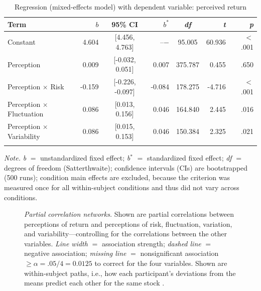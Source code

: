 \documentclass[a4paper,man, natbib,floatsintext]{apa6} %
\begin{document}
\begin{table}[H]
\begin{center}
\begin{threeparttable}
\caption{Regression (mixed-effects model) with dependent variable: perceived return \\\label{study1:mixed_effects_model}}
    \begin{tabular}{lrcrcrr}
    \toprule
    Term & $b$ & 95\% CI & $b^*$ & \textit{df} & \textit{t} & \textit{p}\\
    \midrule
    Constant & 4.604 & [4.456, 4.763] & --$-$ & 95.005 & 60.936 & $<$ .001\\
    Perception & 0.009 & [-0.032, 0.051] & 0.007 & 375.787 & 0.455 & .650\\
    Perception $\times$ Risk & -0.159 & [-0.226, -0.097]  & -0.084 & 178.275 & -4.716 & $<$ .001\\
    Perception $\times$ Fluctuation & 0.086 & [0.013, 0.156] & 0.046 & 164.840 & 2.445 & .016\\
    Perception $\times$ Variability & 0.086 & [0.015, 0.153] & 0.046 & 150.384 & 2.325 & .021\\
    \bottomrule
    \addlinespace
    \end{tabular}
\begin{tablenotes}[para]
\normalsize{\textit{Note.} \textit{b} $=$ unstandardized fixed effect; \textit{b}$^*$ $=$ standardized fixed effect; \textit{df} $=$ degrees of freedom (Satterthwaite); confidence intervals (CIs) are bootstrapped (500 runs); condition main effects are excluded, because the criterion was measured once for all within-subject conditions and thus did not vary across conditions.}
\end{tablenotes}
\end{threeparttable}
\end{center}
\end{table}

\begin{figure}[H] 
 \centering
  \caption{\textit{Partial correlation networks.} Shown are partial correlations between perceptions of return and perceptions of risk, fluctuation, variation, and variability---controlling for the correlations between the other variables. \textit{Line width} $=$ association strength; \textit{dashed line} $=$ negative association; \textit{missing line} $=$ nonsignificant association  $\geq \alpha=.05/4=0.0125$ to correct for the four variables. Shown are within-subject paths, i.e., how each participant's deviations from the means predict each other for the same stock \citep[contemporaneous effects; ][]{Epskamp2018}.}
  \label{fig:pcn}
\end{figure}
\end{document}
